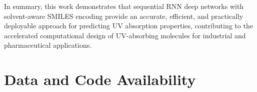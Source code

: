 \documentclass[11pt,a4paper]{article}
\begin{document}
In summary, this work demonstrates that sequential RNN deep networks with solvent-aware 
SMILES encoding provide an accurate, efficient, and practically deployable approach for 
predicting UV absorption properties, contributing to the accelerated computational design of 
UV-absorbing molecules for industrial and pharmaceutical applications.


\section*{Data and Code Availability}




\end{document}
